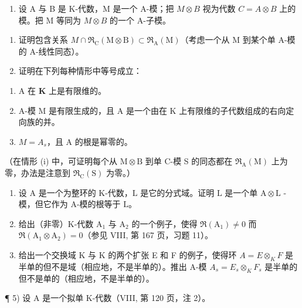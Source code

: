 
\begin{enumerate}
\def\labelenumi{\arabic{enumi})}
\tightlist
\item
  设 A 与 B 是 K-代数，M 是一个 A-模；把 \(M \otimes B\) 视为代数 \(C = A \otimes B\) 上的模。把 M 等同为 \(M \otimes B\) 的一个 A-子模。
\end{enumerate}

\begin{enumerate}
\def\labelenumi{\alph{enumi})}
\item
  证明包含关系 \(M \cap \mathfrak{R}_{\mathrm{C}}(\mathrm{M} \otimes \mathrm{B}) \subset \mathfrak{R}_{\mathrm{A}}(\mathrm{M})\)（考虑一个从 M 到某个单 A-模的 A-线性同态）。
\item
  证明在下列每种情形中等号成立：
\end{enumerate}

\begin{enumerate}
\def\labelenumi{(\roman{enumi})}
\item
  A 在 \(\mathbf{K}\) 上是有限维的。
\item
  A-模 M 是有限生成的，且 A 是一个由在 K 上有限维的子代数组成的右向定向族的并。
\item
  \(M = A_{s}\)，且 A 的根是幂零的。
\end{enumerate}

（在情形 (i) 中，可证明每个从 \(\mathrm{M} \otimes \mathrm{B}\) 到单 C-模 S 的同态都在 \(\Re_{\mathrm{A}}(\mathrm{M})\) 上为零，办法是注意到 \(\Re_{\mathrm{C}}(\mathrm{S})\) 为零。）

\begin{enumerate}
\def\labelenumi{\arabic{enumi})}
\setcounter{enumi}{1}
\item
  设 \(\mathrm{A}\) 是一个为整环的 K-代数，\(\mathrm{L}\) 是它的分式域。证明 \(\mathrm{L}\) 是一个单 \(\mathrm{A} \otimes \mathrm{L}\) -模，但它作为 A-模的根等于 \(\mathrm{L}\)。
\item
  给出（非零）K-代数 \(\mathrm{A}_1\) 与 \(\mathrm{A}_2\) 的一个例子，使得 \(\Re (\mathrm{A}_1)\neq 0\) 而 \(\Re (\mathrm{A}_1\otimes \mathrm{A}_2) = 0\)（参见 VIII, 第 167 页，习题 11）。
\item
  给出一个交换域 K 与 K 的两个扩张 E 和 F 的例子，使得环 \(A = E \otimes_{K} F\) 是半单的但不是域（相应地，不是半单的）。推出 A-模 \(A_{s} = E_{s} \otimes_{K} F_{s}\) 是半单的但不是单的（相应地，不是半单的）。
\end{enumerate}

¶ 5) 设 A 是一个拟单 K-代数（VIII, 第 120 页，注 2）。

